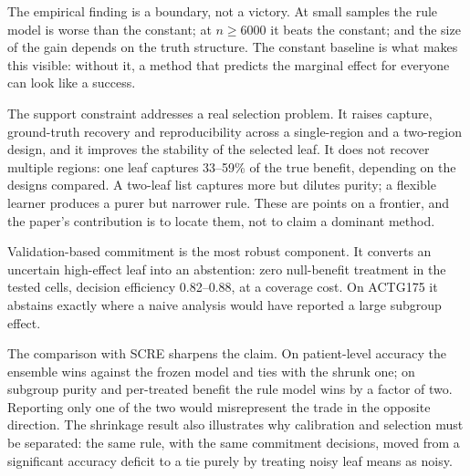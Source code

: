 \documentclass[conference]{IEEEtran}
\begin{document}
The empirical finding is a boundary, not a victory. At small samples the rule
model is worse than the constant; at $n\ge6000$ it beats the constant; and the
size of the gain depends on the truth structure. The constant baseline is what
makes this visible: without it, a method that predicts the marginal effect for
everyone can look like a success.

The support constraint addresses a real selection problem. It raises capture,
ground-truth recovery and reproducibility across a single-region and a
two-region design, and it improves the stability of the selected leaf. It does
not recover multiple regions: one leaf captures 33--59\% of the true benefit,
depending on the designs compared. A two-leaf list captures more but dilutes
purity; a flexible learner produces a purer but narrower rule. These are points
on a frontier, and the paper's contribution is to locate them, not to claim a
dominant method.

Validation-based commitment is the most robust component. It converts an
uncertain high-effect leaf into an abstention: zero null-benefit treatment in
the tested cells, decision efficiency 0.82--0.88, at a coverage cost. On
ACTG175 it abstains exactly where a naive analysis would have reported a large
subgroup effect.

The comparison with SCRE sharpens the claim. On patient-level accuracy the
ensemble wins against the frozen model and ties with the shrunk one; on subgroup
purity and per-treated benefit the rule model wins by a factor of two. Reporting
only one of the two would misrepresent the trade in the opposite direction. The
shrinkage result also illustrates why calibration and selection must be
separated: the same rule, with the same commitment decisions, moved from a
significant accuracy deficit to a tie purely by treating noisy leaf means as
noisy.
\end{document}
